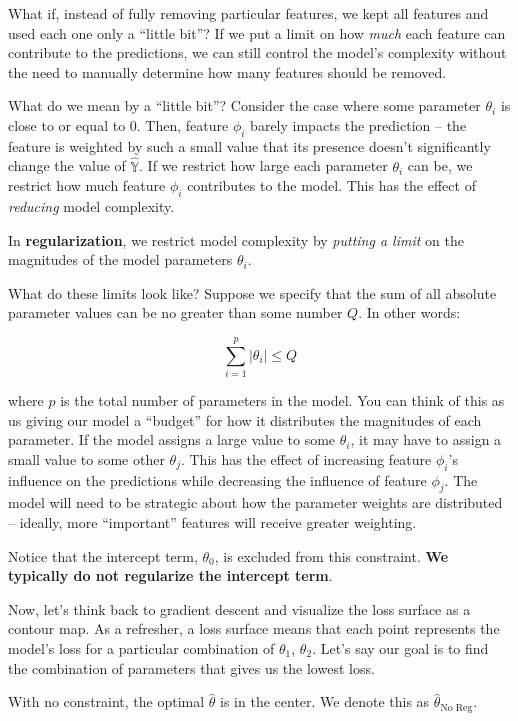 \documentclass[
  letterpaper,
  DIV=11,
  numbers=noendperiod]{scrreprt}
\begin{document}
What if, instead of fully removing particular features, we kept all
features and used each one only a ``little bit''? If we put a limit on
how \emph{much} each feature can contribute to the predictions, we can
still control the model's complexity without the need to manually
determine how many features should be removed.

What do we mean by a ``little bit''? Consider the case where some
parameter \(\theta_i\) is close to or equal to 0. Then, feature
\(\phi_i\) barely impacts the prediction -- the feature is weighted by
such a small value that its presence doesn't significantly change the
value of \(\hat{\mathbb{Y}}\). If we restrict how large each parameter
\(\theta_i\) can be, we restrict how much feature \(\phi_i\) contributes
to the model. This has the effect of \emph{reducing} model complexity.

In \textbf{regularization}, we restrict model complexity by
\emph{putting a limit} on the magnitudes of the model parameters
\(\theta_i\).

What do these limits look like? Suppose we specify that the sum of all
absolute parameter values can be no greater than some number \(Q\). In
other words:

\[\sum_{i=1}^p |\theta_i| \leq Q\]

where \(p\) is the total number of parameters in the model. You can
think of this as us giving our model a ``budget'' for how it distributes
the magnitudes of each parameter. If the model assigns a large value to
some \(\theta_i\), it may have to assign a small value to some other
\(\theta_j\). This has the effect of increasing feature \(\phi_i\)'s
influence on the predictions while decreasing the influence of feature
\(\phi_j\). The model will need to be strategic about how the parameter
weights are distributed -- ideally, more ``important'' features will
receive greater weighting.

Notice that the intercept term, \(\theta_0\), is excluded from this
constraint. \textbf{We typically do not regularize the intercept term}.

Now, let's think back to gradient descent and visualize the loss surface
as a contour map. As a refresher, a loss surface means that each point
represents the model's loss for a particular combination of
\(\theta_1\), \(\theta_2\). Let's say our goal is to find the
combination of parameters that gives us the lowest loss.

With no constraint, the optimal \(\hat{\theta}\) is in the center. We
denote this as \(\hat{\theta}_\text{No Reg}\).
\end{document}
